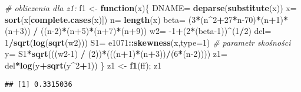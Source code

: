 \documentclass[polish,]{book}
\newenvironment{Shaded}{\begin{snugshade}}{\end{snugshade}}
\newcommand{\CommentTok}[1]{\textcolor[rgb]{0.56,0.35,0.01}{\textit{#1}}}
\newcommand{\ControlFlowTok}[1]{\textcolor[rgb]{0.13,0.29,0.53}{\textbf{#1}}}
\newcommand{\DataTypeTok}[1]{\textcolor[rgb]{0.13,0.29,0.53}{#1}}
\newcommand{\DecValTok}[1]{\textcolor[rgb]{0.00,0.00,0.81}{#1}}
\newcommand{\KeywordTok}[1]{\textcolor[rgb]{0.13,0.29,0.53}{\textbf{#1}}}
\newcommand{\NormalTok}[1]{#1}
\newcommand{\OperatorTok}[1]{\textcolor[rgb]{0.81,0.36,0.00}{\textbf{#1}}}
\newcommand{\StringTok}[1]{\textcolor[rgb]{0.31,0.60,0.02}{#1}}
\begin{document}
\begin{Shaded}
\begin{Highlighting}[]
\CommentTok{# obliczenia dla z1:}
\NormalTok{f1 <-}\StringTok{ }\ControlFlowTok{function}\NormalTok{(x)\{}
\NormalTok{  DNAME=}\StringTok{ }\KeywordTok{deparse}\NormalTok{(}\KeywordTok{substitute}\NormalTok{(x))}
\NormalTok{  x=}\StringTok{ }\KeywordTok{sort}\NormalTok{(x[}\KeywordTok{complete.cases}\NormalTok{(x)])}
\NormalTok{  n=}\StringTok{ }\KeywordTok{length}\NormalTok{(x)}
\NormalTok{  beta=}\StringTok{ }\NormalTok{(}\DecValTok{3}\OperatorTok{*}\NormalTok{(n}\OperatorTok{^}\DecValTok{2}\OperatorTok{+}\DecValTok{27}\OperatorTok{*}\NormalTok{n}\DecValTok{-70}\NormalTok{)}\OperatorTok{*}\NormalTok{(n}\OperatorTok{+}\DecValTok{1}\NormalTok{)}\OperatorTok{*}\NormalTok{(n}\OperatorTok{+}\DecValTok{3}\NormalTok{)) }\OperatorTok{/}\StringTok{ }\NormalTok{((n}\DecValTok{-2}\NormalTok{)}\OperatorTok{*}\NormalTok{(n}\OperatorTok{+}\DecValTok{5}\NormalTok{)}\OperatorTok{*}\NormalTok{(n}\OperatorTok{+}\DecValTok{7}\NormalTok{)}\OperatorTok{*}\NormalTok{(n}\OperatorTok{+}\DecValTok{9}\NormalTok{))}
\NormalTok{  w2=}\StringTok{ }\DecValTok{-1}\OperatorTok{+}\NormalTok{(}\DecValTok{2}\OperatorTok{*}\NormalTok{(beta}\DecValTok{-1}\NormalTok{))}\OperatorTok{^}\NormalTok{(}\DecValTok{1}\OperatorTok{/}\DecValTok{2}\NormalTok{)}
\NormalTok{  del=}\StringTok{ }\DecValTok{1}\OperatorTok{/}\KeywordTok{sqrt}\NormalTok{(}\KeywordTok{log}\NormalTok{(}\KeywordTok{sqrt}\NormalTok{(w2)))}
\NormalTok{  S1=}\StringTok{ }\NormalTok{e1071}\OperatorTok{::}\KeywordTok{skewness}\NormalTok{(x,}\DataTypeTok{type=}\DecValTok{1}\NormalTok{) }\CommentTok{# parametr skośności}
\NormalTok{  y=}\StringTok{ }\NormalTok{S1}\OperatorTok{*}\KeywordTok{sqrt}\NormalTok{(((w2}\DecValTok{-1}\NormalTok{) }\OperatorTok{/}\StringTok{ }\NormalTok{(}\DecValTok{2}\NormalTok{))}\OperatorTok{*}\NormalTok{(((n}\OperatorTok{+}\DecValTok{1}\NormalTok{)}\OperatorTok{*}\NormalTok{(n}\OperatorTok{+}\DecValTok{3}\NormalTok{))}\OperatorTok{/}\NormalTok{(}\DecValTok{6}\OperatorTok{*}\NormalTok{(n}\DecValTok{-2}\NormalTok{))))}
\NormalTok{  z1=}\StringTok{ }\NormalTok{del}\OperatorTok{*}\KeywordTok{log}\NormalTok{(y}\OperatorTok{+}\KeywordTok{sqrt}\NormalTok{(y}\OperatorTok{^}\DecValTok{2}\OperatorTok{+}\DecValTok{1}\NormalTok{))}
\NormalTok{  \}}
\NormalTok{z1 <-}\StringTok{ }\KeywordTok{f1}\NormalTok{(ff); z1}
\end{Highlighting}
\end{Shaded}

\begin{verbatim}
## [1] 0.3315036
\end{verbatim}
\end{document}
